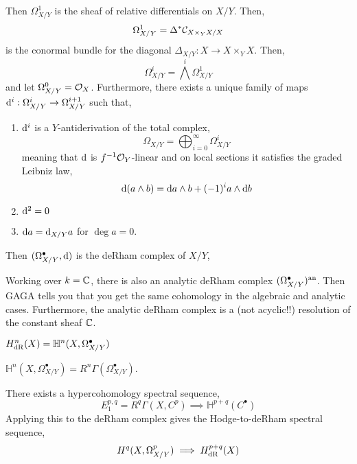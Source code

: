 \documentclass[12pt]{article}
\begin{document}
\begin{defn}
Then $\Omega^1_{X/Y}$ is the sheaf of relative differentials on $X/Y$. Then,
\[ \Omega^1_{X/Y} = \Delta^* \mathcal{C}_{X \times_Y X/X} \]
is the conormal bundle for the diagonal $\Delta_{X/Y} : X \to X \times_Y X$. Then,
\[ \Omega^i_{X/Y} = \bigwedge^i \Omega^1_{X/Y} \]
and let $\Omega^0_{X/Y} = \mathcal{O}_{X}$. Furthermore, there exists a unique family of maps $\mathrm{d}^i : \Omega^i_{X/Y} \to \Omega^{i+1}_{X/Y}$ such that,
\begin{enumerate}
\item $\mathrm{d}^i$ is a $Y$-antiderivation of the total complex,
\[ \Omega_{X/Y} = \bigoplus_{i = 0}^\infty \Omega^i_{X/Y} \]
meaning that $\mathrm{d}$ is $f^{-1} \mathcal{O}_{Y}$-linear and on local sections it satisfies the graded Leibniz law,
\[ \mathrm{d}{(a \wedge b)} = \mathrm{d}{a} \wedge b + (-1)^i a \wedge \mathrm{d}{b} \]
\item $\mathrm{d}^2 = 0$
\item $\mathrm{d}{a} = \mathrm{d}_{X/Y}{a}$ for $\deg{a} = 0$.
\end{enumerate}
Then $(\Omega^\bullet_{X/Y}, \mathrm{d})$ is the deRham complex of $X/Y$,
\begin{center}
\end{center}
\end{defn}

\begin{rmk}
Working over $k = \mathbb{C}$, there is also an analytic deRham complex $(\Omega^\bullet_{X/Y})^{\mathrm{an}}$. Then GAGA tells you that you get the same cohomology in the algebraic and analytic cases. Furthermore, the analytic deRham complex is a (not acyclic!!) resolution of the constant sheaf $\mathbb{C}$.
\end{rmk}

\begin{defn}
$H^n_{\mathrm{dR}}(X) = \mathbb{H}^n(X, \Omega^\bullet_{X/Y})$
\end{defn}

\begin{rmk}
$\mathbb{H}^n(X, \Omega_{X/Y}^\bullet) = R^n \Gamma(\Omega_{X/Y}^\bullet)$.
\end{rmk}

\begin{rmk}
There exists a hypercohomology spectral sequence,
\[ E_1^{p,q} = R^q \Gamma(X, C^p) \implies \mathbb{H}^{p+q}(C^\bullet) \]
Applying this to the deRham complex gives the Hodge-to-deRham spectral sequence,
\[ H^q(X, \Omega^p_{X/Y}) \implies H^{p+q}_{\mathrm{dR}}(X) \]
\end{rmk}
\end{document}
